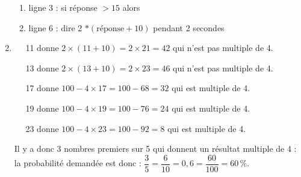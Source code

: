 \begin{enumerate}
	\begin{enumerate}
		\item %
		
		ligne 3 : si réponse $> 15$  alors
		\item %
		
		ligne 6 : dire 2 $*(\text{réponse}  + 10)$ pendant 2 secondes
	\end{enumerate}
\item %


\starredbullet~~ 11 donne $2 \times (11+ 10) = 2\times 21 = 42$ qui n'est pas multiple de 4.

\starredbullet~~ 13 donne $2 \times (13+ 10) = 2\times 23 = 46$ qui n'est pas multiple de 4.

\starredbullet~~ 17 donne $100 - 4 \times 17 = 100 - 68 = 32$ qui est  multiple de 4.

\starredbullet~~ 19 donne $100 - 4 \times 19 = 100 - 76 = 24$ qui est  multiple de 4.

\starredbullet~~ 23 donne $100 - 4 \times 23 = 100 - 92 = 8$ qui est  multiple de 4.

Il y a donc 3 nombres premiers sur 5 qui donnent un résultat multiple de 4 : la probabilité demandée est donc : $\dfrac{3}{5} = \dfrac{6}{10} = 0,6 = \dfrac{60}{100} = 60\,\%$.
\end{enumerate}

\bigskip

